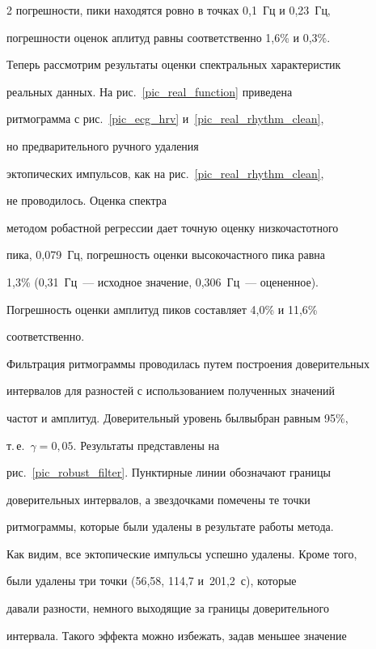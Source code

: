\begin{multicols}{2}
погрешности, пики находятся ровно в точках 0,1~Гц и 0,23~Гц,


погрешности оценок аплитуд равны соответственно 1,6\% и 0,3\%.





Теперь рассмотрим результаты оценки спектральных характеристик


реальных данных. На рис.~\ref{pic_real_function} приведена


ритмограмма с рис.~\ref{pic_ecg_hrv} и~\ref{pic_real_rhythm_clean},


но предварительного ручного удаления


эктопических импульсов, как на рис.~\ref{pic_real_rhythm_clean},


не проводилось. Оценка спектра


методом робастной регрессии дает точную оценку низкочастотного


пика, 0,079~Гц, погрешность оценки высокочастного пика равна


1,3\% (0,31~Гц~--- исходное значение, 0,306~Гц~--- оцененное).


Погрешность оценки амплитуд пиков со\-став\-ля\-ет 4,0\% и 11,6\%


соответственно.





Фильтрация ритмограммы проводилась путем построения доверительных


интервалов для разностей с использованием полученных значений


час\-тот и амплитуд. Доверительный уровень был\linebreak выбран равным 95\%,


т.\,е.\ $\gamma=0{,}05$. Результаты представлены на


рис.~\ref{pic_robust_filter}. Пунктирные линии обозначают границы


доверительных интервалов, а звездочками помечены те точки


ритмограммы, которые были удалены в результате работы метода.





Как  видим, все эктопические импульсы успешно удалены. Кроме того,


были удалены три точки (56,58, 114,7 и~201,2~с), которые


давали разности, немного выходящие за границы доверительного


интервала. Такого эффекта можно избежать, задав меньшее значение



\end{multicols}
